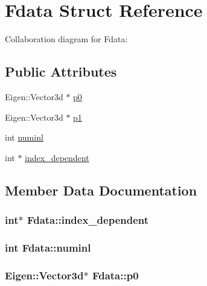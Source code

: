 \hypertarget{structFdata}{}\section{Fdata Struct Reference}
\label{structFdata}


Collaboration diagram for Fdata\+:
\subsection*{Public Attributes}
\begin{DoxyCompactItemize}
\item 
Eigen\+::\+Vector3d $\ast$ \hyperlink{structFdata_ab15f553f5bb19bd6d11db8d9a91170e0}{p0}
\item 
Eigen\+::\+Vector3d $\ast$ \hyperlink{structFdata_af6610aef66eaa2706fe2c60e831d8ec7}{p1}
\item 
int \hyperlink{structFdata_ab2d6b61e02412b956992c7ed66fb0d99}{numinl}
\item 
int $\ast$ \hyperlink{structFdata_a9dd39e14eb1a4bdb88000119fcc25900}{index\+\_\+dependent}
\end{DoxyCompactItemize}


\subsection{Member Data Documentation}
\hypertarget{structFdata_a9dd39e14eb1a4bdb88000119fcc25900}{}
\subsubsection[{index\+\_\+dependent}]{\setlength{\rightskip}{0pt plus 5cm}int$\ast$ Fdata\+::index\+\_\+dependent}\label{structFdata_a9dd39e14eb1a4bdb88000119fcc25900}
\hypertarget{structFdata_ab2d6b61e02412b956992c7ed66fb0d99}{}
\subsubsection[{numinl}]{\setlength{\rightskip}{0pt plus 5cm}int Fdata\+::numinl}\label{structFdata_ab2d6b61e02412b956992c7ed66fb0d99}
\hypertarget{structFdata_ab15f553f5bb19bd6d11db8d9a91170e0}{}
\subsubsection[{p0}]{\setlength{\rightskip}{0pt plus 5cm}Eigen\+::\+Vector3d$\ast$ Fdata\+::p0}\label{structFdata_ab15f553f5bb19bd6d11db8d9a91170e0}
\hypertarget{structFdata_af6610aef66eaa2706fe2c60e831d8ec7}{}
